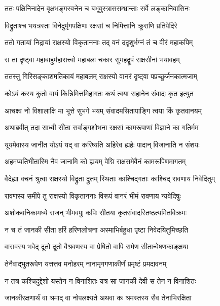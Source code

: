 
\twolineshloka
{ततः पक्षिनिनादेन वृक्षभङ्गस्वनेन च}
{बभूवुस्त्राससम्भ्रान्ताः सर्वे लङ्कानिवासिनः} %

\twolineshloka
{विद्रुताश्च भयत्रस्ता विनेदुर्मृगपक्षिणः}
{रक्षसां च निमित्तानि क्रूराणि प्रतिपेदिरे} %

\twolineshloka
{ततो गतायां निद्रायां राक्षस्यो विकृताननाः}
{तद् वनं ददृशुर्भग्नं तं च वीरं महाकपिम्} %

\twolineshloka
{स ता दृष्ट्वा महाबाहुर्महासत्त्वो महाबलः}
{चकार सुमहद्रूपं राक्षसीनां भयावहम्} %

\twolineshloka
{ततस्तु गिरिसङ्काशमतिकायं महाबलम्}
{राक्षस्यो वानरं दृष्ट्वा पप्रच्छुर्जनकात्मजाम्} %

\twolineshloka
{कोऽयं कस्य कुतो वायं किन्निमित्तमिहागतः}
{कथं त्वया सहानेन संवादः कृत इत्युत} %

\twolineshloka
{आचक्ष्व नो विशालाक्षि मा भूत्ते सुभगे भयम्}
{संवादमसितापाङ्गि त्वया किं कृतवानयम्} %

\twolineshloka
{अथाब्रवीत् तदा साध्वी सीता सर्वाङ्गशोभना}
{रक्षसां कामरूपाणां विज्ञाने का गतिर्मम} %

\twolineshloka
{यूयमेवास्य जानीत योऽयं यद् वा करिष्यति}
{अहिरेव ह्यहेः पादान् विजानाति न संशयः} %

\twolineshloka
{अहमप्यतिभीतास्मि नैव जानामि को ह्ययम्}
{वेद्मि राक्षसमेवैनं कामरूपिणमागतम्} %

\twolineshloka
{वैदेह्या वचनं श्रुत्वा राक्षस्यो विद्रुता द्रुतम्}
{स्थिताः काश्चिद्गताः काश्चिद् रावणाय निवेदितुम्} %

\twolineshloka
{रावणस्य समीपे तु राक्षस्यो विकृताननाः}
{विरूपं वानरं भीमं रावणाय न्यवेदिषुः} %

\twolineshloka
{अशोकवनिकामध्ये राजन् भीमवपुः कपिः}
{सीतया कृतसंवादस्तिष्ठत्यमितविक्रमः} %

\twolineshloka
{न च तं जानकी सीता हरिं हरिणलोचना}
{अस्माभिर्बहुधा पृष्टा निवेदयितुमिच्छति} %

\twolineshloka
{वासवस्य भवेद् दूतो दूतो वैश्रवणस्य वा}
{प्रेषितो वापि रामेण सीतान्वेषणकाङ्क्षया} %

\twolineshloka
{तेनैवाद्भुतरूपेण यत्तत्तव मनोहरम्}
{नानामृगगणाकीर्णं प्रमृष्टं प्रमदावनम्} %

\twolineshloka
{न तत्र कश्चिदुद्देशो यस्तेन न विनाशितः}
{यत्र सा जानकी देवी स तेन न विनाशितः} %

\twolineshloka
{जानकीरक्षणार्थं वा श्रमाद् वा नोपलक्ष्यते}
{अथवा कः श्रमस्तस्य सैव तेनाभिरक्षिता} %

